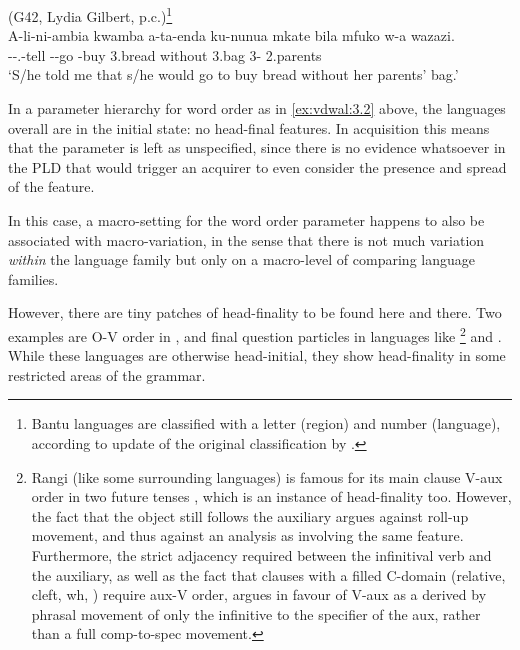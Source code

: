 \documentclass[output=paper]{langsci/langscibook}
\begin{document}
\ea\label{bkm:Ref343702566} (G42, Lydia Gilbert, p.c.)\footnote{Bantu languages are classified with a letter (region) and number (language), according to  update of the original classification by \citet{Guthrie1948}.}\\
    \gll    A-li-ni-ambia  kwamba  a-ta-enda  ku-nunua  mkate bila  mfuko  w-a  wazazi.\\
            \First\Sm{}{}-\Pst-\Fsg{}.\Om{}-tell  \Comp{}  \First\Sm{}-\Fut-go \Inf{}-buy  3.bread without  3.bag  3-\Conn{}  2.parents\\
    \glt    ‘S/he told me that s/he would go to buy bread without her parents’ bag.’
\z

In a parameter hierarchy for word order as in \eqref{ex:vdwal:3.2} above, the 
languages overall are in the initial state: no head-final features. In
acquisition this means that the parameter is left as unspecified, since there
is no evidence whatsoever in the \gls{PLD} that would trigger an acquirer to even
consider the presence and spread of the feature.

In this case, a macro-setting for the word order parameter happens to also be
associated with macro-variation, in the sense that there is not much variation
\emph{within} the  language family but only on a macro-level of comparing
language families.

However, there are tiny patches of head-finality to be found here and there.
Two examples are O-V order in , and final question particles in
languages like \footnote{Rangi (like some surrounding languages) is
    famous for its main clause V-aux order in two future tenses
    \citep{Gibson2016}, which is an instance of head-finality too. However, the
    fact that the object still follows the auxiliary argues
    against roll-up movement, and thus against an analysis
    as involving the same feature. Furthermore, the strict adjacency required
    between the infinitival verb and the auxiliary, as well as
    the fact that clauses with a filled C-domain (relative, cleft,
    wh, ) require aux-V order,  argues in favour of V-aux as a
derived by phrasal movement of only the infinitive to the
specifier of the aux, rather than a full comp-to-spec movement.} and
.  While these languages are otherwise head-initial, they show
head-finality in some restricted areas of the grammar.
\end{document}
